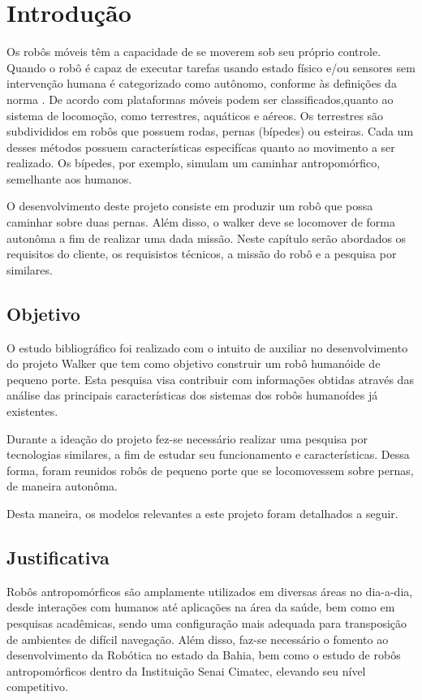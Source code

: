 \chapter{Introdução}
\label{chap:intro}

Os robôs móveis têm a capacidade de se moverem sob seu próprio controle. Quando o robô é capaz de executar tarefas usando estado físico e/ou sensores sem intervenção humana é categorizado como autônomo, conforme às definições da norma \cite{ISO}. De acordo com \cite{Rubio} plataformas móveis podem ser classificados,quanto ao sistema de locomoção, como terrestres, aquáticos e aéreos. Os terrestres são subdivididos em robôs que possuem rodas, pernas (bípedes) ou esteiras. Cada um desses métodos possuem características especifícas quanto ao movimento a ser realizado. Os bípedes, por exemplo, simulam um caminhar antropomórfico, semelhante aos humanos. 

O desenvolvimento deste projeto consiste em produzir um robô que possa caminhar sobre duas pernas. Além disso, o walker deve se locomover de forma autonôma a fim de realizar uma dada missão.
Neste capítulo serão abordados os requisitos do cliente, os requisistos técnicos, a missão do robô e a pesquisa por similares. 


\section{Objetivo}
\label{sec:obj}

O estudo bibliográfico foi realizado com o intuito de auxiliar no desenvolvimento do projeto Walker que tem como objetivo construir um robô humanóide de pequeno porte. Esta pesquisa visa contribuir com informações obtidas através das análise das principais características dos sistemas dos robôs humanoídes já existentes. 

Durante a ideação do projeto fez-se necessário realizar uma pesquisa por tecnologias similares, a fim de estudar seu funcionamento e características. Dessa forma, foram reunidos robôs de pequeno porte que se locomovessem sobre pernas, de maneira autonôma.

Desta maneira, os modelos relevantes a este projeto foram detalhados a seguir. 

\section{Justificativa}
\label{sec:justi}

Robôs antropomórficos são amplamente utilizados em diversas áreas no dia-a-dia, desde interações com humanos até aplicações na área da saúde, bem como em pesquisas acadêmicas, sendo uma configuração mais adequada para transposição de ambientes de difícil navegação.
Além disso, faz-se necessário o fomento ao desenvolvimento da Robótica no estado da Bahia, bem como o estudo de robôs antropomórficos dentro da Instituição Senai Cimatec, elevando seu nível competitivo.

